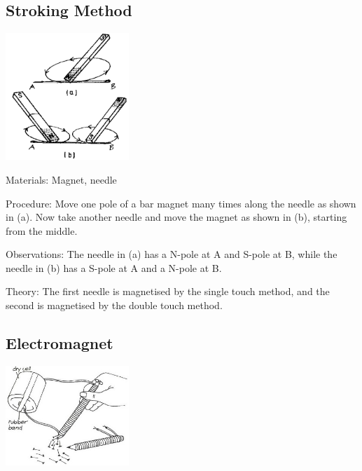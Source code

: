 \begin{multicols}{2}
\subsection{Stroking Method}

\begin{center}
\includegraphics[width=0.35\textwidth]{./img/source/mag-stroke.png}
\end{center}

\begin{description*}
\item[Materials:]{Magnet, needle}
\item[Procedure:]{Move one pole of a bar magnet many times along the needle as shown in (a). Now take another needle and move the magnet as shown in (b), starting from the middle.}
\item[Observations:]{The needle in (a) has a N-pole at A and S-pole at B, while the needle in (b) has a S-pole at A and a N-pole at B.}
\item[Theory:]{The first needle is magnetised by the single touch method, and the second is magnetised by the double touch method.}
\end{description*}

\subsection{Electromagnet}

\begin{center}
\includegraphics[width=0.35\textwidth]{./img/vso/electromagnet.jpg}
\end{center}


\end{multicols}
